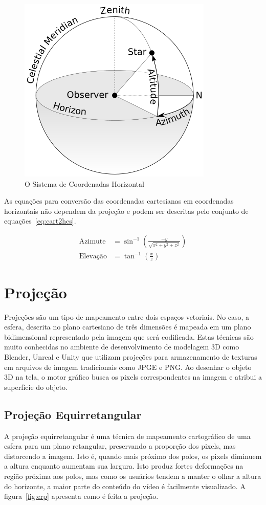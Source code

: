 \begin{figure}[h]
	\centering
	\includegraphics[width=0.30\linewidth]{fig/hcs.png}
	\caption{O Sistema de Coordenadas Horizontal}
	\label{fig:hcs}
\end{figure}

As equações para conversão das coordenadas cartesianas em coordenadas horizontais não dependem da projeção e podem ser descritas pelo conjunto de equações~\ref{eq:cart2hcs}.

\begin{equation}
\label{eq:cart2hcs}
\begin{split}
	\text{Azimute} &=\sin^{-1}\left(\frac{-y}{\sqrt{x^2+y^2+z^2}}\right) \\
	\text{Elevação} &=\tan^{-1}\left(\frac{x}{z}\right)
\end{split}
\end{equation}


\section{Projeção}

Projeções são um tipo de mapeamento entre dois espaços vetoriais. No caso, a esfera, descrita no plano cartesiano de três dimensões é mapeada em um plano bidimensional representado pela imagem que será codificada. Estas técnicas são muito conhecidas no ambiente de desenvolvimento de modelagem 3D como Blender, Unreal e Unity que utilizam projeções para armazenamento de texturas em arquivos de imagem tradicionais como JPGE e PNG. Ao desenhar o objeto 3D na tela, o motor gráfico busca os pixels correspondentes na imagem e atribui a superfície do objeto.


\subsection{Projeção Equirretangular}

A projeção equirretangular é uma técnica de mapeamento cartográfico de uma esfera para um plano retangular, preservando a proporção dos pixels, mas distorcendo a imagem. Isto é, quando mais próximo dos polos, os pixels diminuem a altura enquanto aumentam sua largura. Isto produz fortes deformações na região próxima aos polos, mas como os usuários tendem a manter o olhar a altura do horizonte, a maior parte do conteúdo do vídeo é facilmente visualizado. A figura~\ref{fig:erp} apresenta como é feita a projeção.

